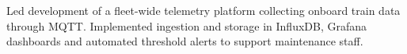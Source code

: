 Led development of a fleet-wide telemetry platform collecting onboard train data through MQTT. Implemented ingestion and storage in InfluxDB, Grafana dashboards and automated threshold alerts to support maintenance staff.

